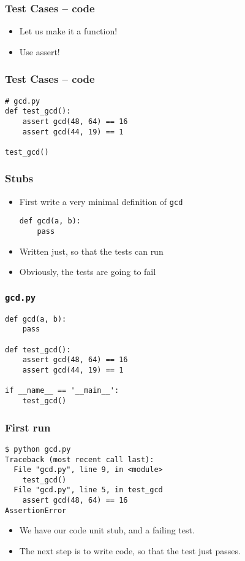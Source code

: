 \documentclass[12pt,presentation]{beamer}
\begin{document}
\begin{frame}[fragile]
  \frametitle{Test Cases -- code}
  \begin{itemize}
      \item Let us make it a function!
      \item Use assert!
  \end{itemize}
\end{frame}

\begin{frame}[fragile]
  \frametitle{Test Cases -- code}
\begin{lstlisting}
# gcd.py
def test_gcd():
    assert gcd(48, 64) == 16
    assert gcd(44, 19) == 1

test_gcd()
\end{lstlisting}
\end{frame}

\begin{frame}[fragile]
  \frametitle{Stubs}
  \begin{itemize}
  \item First write a very minimal definition of \texttt{gcd}
    \begin{lstlisting}
def gcd(a, b):
    pass
    \end{lstlisting}
  \item Written just, so that the tests can run
  \item Obviously, the tests are going to fail
  \end{itemize}
\end{frame}

\begin{frame}[fragile]
  \frametitle{\texttt{gcd.py}}
\begin{lstlisting}
def gcd(a, b):
    pass

def test_gcd():
    assert gcd(48, 64) == 16
    assert gcd(44, 19) == 1

if __name__ == '__main__':
    test_gcd()
\end{lstlisting}
\end{frame}

\begin{frame}[fragile]
  \frametitle{First run}
\begin{lstlisting}
$ python gcd.py
Traceback (most recent call last):
  File "gcd.py", line 9, in <module>
    test_gcd()
  File "gcd.py", line 5, in test_gcd
    assert gcd(48, 64) == 16
AssertionError
\end{lstlisting} %

  \begin{itemize}
  \item We have our code unit stub, and a failing test.
  \item The next step is to write code, so that the test just passes.
  \end{itemize}
\end{frame}
\end{document}
